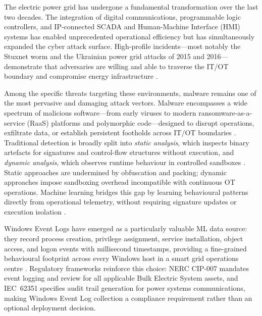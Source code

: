 The electric power grid has undergone a fundamental transformation over the last two
decades. The integration of digital communications, programmable logic controllers, and
IP-connected SCADA and Human-Machine Interface (HMI) systems has enabled
unprecedented operational efficiency but has simultaneously expanded the cyber attack
surface. High-profile incidents—most notably the Stuxnet worm \cite{langner2011stuxnet}
and the Ukrainian power grid attacks of 2015 and 2016—demonstrate that adversaries are
willing and able to traverse the IT/OT boundary and compromise energy infrastructure
\cite{nafees2023}.

Among the specific threats targeting these environments, malware remains one of the most
pervasive and damaging attack vectors. Malware encompasses a wide spectrum of malicious
software—from early viruses to modern ransomware-as-a-service (RaaS) platforms and
polymorphic code—designed to disrupt operations, exfiltrate data, or establish persistent
footholds across IT/OT boundaries \cite{maniriho2024}. Traditional detection is
broadly split into \emph{static analysis}, which inspects binary artefacts for signatures
and control-flow structures without execution, and \emph{dynamic analysis}, which
observes runtime behaviour in controlled sandboxes \cite{ayub2023}. Static approaches
are undermined by obfuscation and packing; dynamic approaches impose sandboxing overhead
incompatible with continuous OT operations. Machine learning bridges this gap by learning
behavioural patterns directly from operational telemetry, without requiring signature
updates or execution isolation \cite{onal2025}.

Windows Event Logs have emerged as a particularly valuable ML data source: they record
process creation, privilege assignment, service installation, object access, and logon
events with millisecond timestamps, providing a fine-grained behavioural footprint across
every Windows host in a smart grid operations centre \cite{achmad2025}. Regulatory
frameworks reinforce this choice: NERC CIP-007 mandates event logging and review for
all applicable Bulk Electric System assets, and IEC~62351 specifies audit trail
generation for power systems communications, making Windows Event Log collection a
compliance requirement rather than an optional deployment decision.

